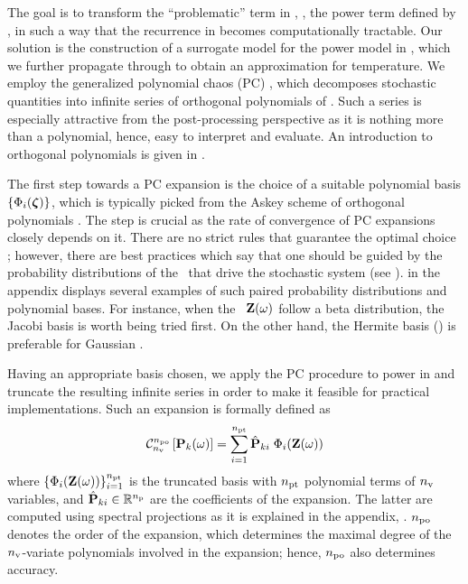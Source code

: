 The goal is to transform the ``problematic'' term in , \ie, the power term defined by , in such a way that the recurrence in  becomes computationally tractable. Our solution is the construction of a surrogate model for the power model in , which we further propagate through  to obtain an approximation for temperature. We employ the generalized polynomial chaos (PC) \cite{xiu2010}, which decomposes stochastic quantities into infinite series of orthogonal polynomials of \rvs. Such a series is especially attractive from the post-processing perspective as it is nothing more than a polynomial, hence, easy to interpret and evaluate. An introduction to orthogonal polynomials is given in .

The first step towards a PC expansion is the choice of a suitable polynomial basis $\{ \Phi_i(\boldsymbol{\zeta}) \}$, which is typically picked from the Askey scheme of orthogonal polynomials \cite{xiu2010}. The step is crucial as the rate of convergence of PC expansions closely depends on it. There are no strict rules that guarantee the optimal choice \cite{maitre2010, knio2006}; however, there are best practices which say that one should be guided by the probability distributions of the \rvs\ that drive the stochastic system (see ).  in the appendix displays several examples of such paired probability distributions and polynomial bases. For instance, when the \rvs\ $\mathbf{Z}(\omega)$ follow a beta distribution, the Jacobi basis is worth being tried first. On the other hand, the Hermite basis () is preferable for Gaussian \rvs.

Having an appropriate basis chosen, we apply the PC procedure to power in  and truncate the resulting infinite series in order to make it feasible for practical implementations. Such an expansion is formally defined as
\begin{equation} \elabel{pc-expansion}
  \oPC{\nvars}{\pcorder}{\vP_k(\o)} = \sum_{i = 1}^{\pcterms} \pcc{\vP}_{ki} \; \pcb_i(\vZ(\o))
\end{equation}
where $\{ \Phi_i(\mathbf{Z}(\omega)) \}_{i = 1}^{{n_\text{pt}}}$ is the truncated basis with ${n_\text{pt}}$ polynomial terms of ${n_\text{v}}$ variables, and $\hat{\mathbf{P}}_{ki} \in \mathbb{R}^{n_\text{p}}$ are the coefficients of the expansion. The latter are computed using spectral projections as it is explained in the appendix, . ${n_\text{po}}$ denotes the order of the expansion, which determines the maximal degree of the ${n_\text{v}}$-variate polynomials involved in the expansion; hence, ${n_\text{po}}$ also determines accuracy.

